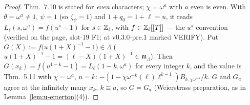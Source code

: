 \documentclass[11pt]{article}
\newcommand{\VERIFYloc}{\textsf{VERIFY}}          %
\newcommand{\Iw}{\Lambda}                         %
\newcommand{\Zl}{\Z_\ell}
\begin{document}
\begin{proof}
Thm.~7.10 is stated for \emph{even} characters; $\chi=\omega^{a}$ with $a$ even is even. With $\theta=\omega^{a}\ne1$, $\psi=1$ (so $\zeta_\psi=1$) and $1+q_0=1+\ell=u$, it
reads $L_\ell(s,\omega^{a})=f(u^{s}-1)$ for $s\in\Zl$, with $f\in\Zl[[T]]$ --- the $u^{s}$ convention (verified on the page, slot-19 F1; at v0.3.0-pre.1 marked
\VERIFYloc). Put $G(X):=f\bigl(u(1+X)^{-1}-1\bigr)\in\Iw$ ($u(1+X)^{-1}-1=(\ell-X)(1+X)^{-1}\in\mathfrak m_\Iw$). Then $G(x_k)=f(u^{1-k}-1)=L_\ell(1-k,\omega^{a})$ for
every integer $k$, and the value is Thm.~5.11 with $\chi=\omega^{a}$, $n=k$: $-(1-\chi\omega^{-k}(\ell)\ell^{k-1})B_{k,\chi\omega^{-k}}/k$. $G$ and $G_a$ agree at the
infinitely many $x_k$, $k\equiv a$, so $G=G_a$ (Weierstrass preparation, as in Lemma~\ref{lem:u-emerton}(4)).
\end{proof}
\end{document}

